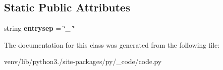 \subsection*{Static Public Attributes}
\begin{DoxyCompactItemize}
\item 
\mbox{\label{classpy_1_1__code_1_1code_1_1_repr_traceback_ae5963822d47f0ed50c39873f40d8010f}} 
string {\bfseries entrysep} = \char`\"{}\+\_\+ \char`\"{}
\end{DoxyCompactItemize}


The documentation for this class was generated from the following file\+:\begin{DoxyCompactItemize}
\item 
venv/lib/python3./site-\/packages/py/\+\_\+code/code.\+py\end{DoxyCompactItemize}
